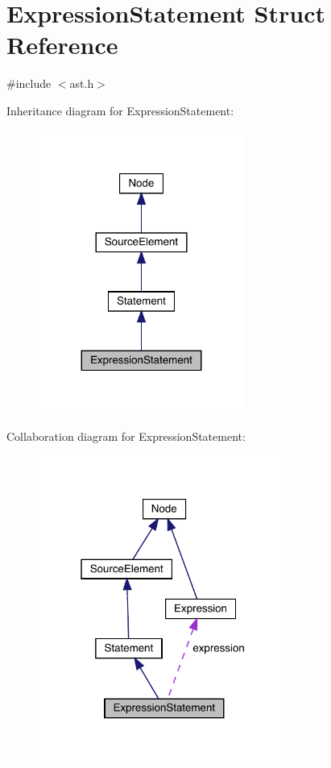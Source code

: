 \hypertarget{struct_expression_statement}{}\section{Expression\+Statement Struct Reference}
\label{struct_expression_statement}


{\ttfamily \#include $<$ast.\+h$>$}



Inheritance diagram for Expression\+Statement\+:
\nopagebreak
\begin{figure}[H]
\begin{center}
\leavevmode
\includegraphics[width=191pt]{struct_expression_statement__inherit__graph}
\end{center}
\end{figure}


Collaboration diagram for Expression\+Statement\+:
\nopagebreak
\begin{figure}[H]
\begin{center}
\leavevmode
\includegraphics[width=232pt]{struct_expression_statement__coll__graph}
\end{center}
\end{figure}
